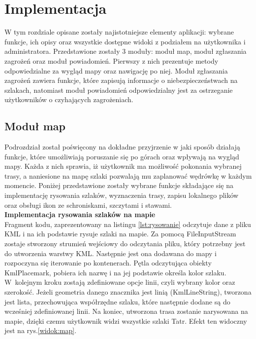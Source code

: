 \section{Implementacja}
W tym rozdziale opisane zostały najistotniejsze elementy aplikacji: wybrane funkcje, ich opisy oraz wszystkie dostępne widoki z podziałem na użytkownika i administratora. 
Przedstawione zostały 3 moduły: moduł map, moduł zgłaszania zagrożeń oraz moduł powiadomień. Pierwszy z nich prezentuje metody odpowiedzialne za wygląd mapy oraz nawigację po niej. Moduł zgłaszania zagrożeń zawiera funkcje, które zapisują informacje o niebezpieczeństwach na szlakach, natomiast moduł powiadomień odpowiedzialny jest za ostrzeganie użytkowników o czyhających zagrożeniach.
\subsection{Moduł map}
Podrozdział został poświęcony na dokładne przyjrzenie w jaki sposób działają funkcje, które umożliwiają poruszanie się po górach oraz wpływają na wygląd mapy. Każda z nich sprawia, iż użytkownik ma możliwość pokonania wybranej trasy, a naniesione na mapę szlaki pozwalają mu zaplanować wędrówkę w każdym momencie. Poniżej przedstawione zostały wybrane funkcje składające się na implementację rysowania szlaków, wyznaczenia trasy, zapisu lokalnego plików oraz obsługi ikon ze schroniskami, szczytami i stawami.
\\ 

\noindent
\textbf{Implementacja rysowania szlaków na mapie} \\
\indent Fragment kodu, zaprezentowany na listingu \ref{lst:rysowanie} odczytuje dane z pliku KML i na ich podstawie rysuje szlaki na mapie. Za pomocą FileInputStream zostaje stworzony strumień wejściowy do odczytania pliku, który potrzebny jest do utworzenia warstwy KML. Następnie jest ona dodawana do mapy i rozpoczyna się iterowanie po kontenerach. Pętla odczytująca obiekty KmlPlacemark, pobiera ich nazwę i na jej podstawie określa kolor szlaku. W~kolejnym kroku zostają zdefiniowane opcje linii, czyli wybrany kolor oraz szerokość. Jeżeli geometria danego znacznika jest linią (KmlLineString), tworzona jest lista, przechowująca współrzędne szlaku, które następnie dodane są do wcześniej zdefiniowanej linii. Na koniec, utworzona trasa zostanie narysowana na mapie, dzięki czemu użytkownik widzi wszystkie szlaki Tatr. Efekt ten widoczny jest na rys.\ref{widok:map}.\\

